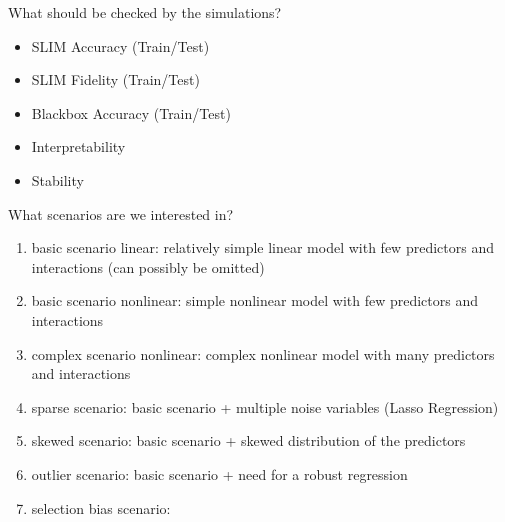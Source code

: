 What should be checked by the simulations?
\begin{itemize}
    \item SLIM Accuracy (Train/Test)
    \item SLIM Fidelity (Train/Test)
    \item Blackbox Accuracy (Train/Test)
    \item Interpretability
    \item Stability
\end{itemize}


What scenarios are we interested in?
\begin{enumerate}
    \item basic scenario linear: relatively simple linear model with few predictors and interactions (can possibly be omitted)
    \item basic scenario nonlinear: simple nonlinear model with few predictors and interactions 
    \item complex scenario nonlinear:  complex nonlinear model with many predictors and interactions 
    \item sparse scenario: basic scenario + multiple noise variables (Lasso Regression)
    \item skewed scenario: basic scenario + skewed distribution of the predictors
    \item outlier scenario: basic scenario + need for a robust regression
    \item selection bias scenario: 
\end{enumerate}
